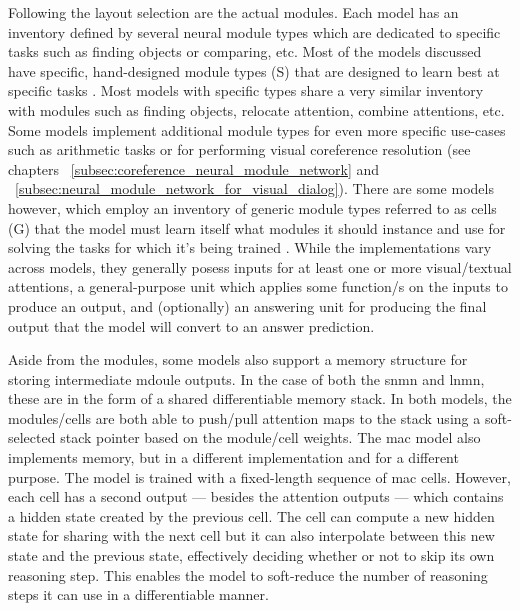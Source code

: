 Following the layout selection are the actual modules.
Each model has an inventory defined by several neural module types which are dedicated to specific tasks such as finding objects or comparing, etc.
Most of the models discussed have specific, hand-designed module types (S) that are designed to learn best at specific tasks \cite{andreas_deep_2016,hu_learning_2017,hu_explainable_2019,chen_teaching_2022,su_toward_2020,kottur_visual_2018,cho_visual_2021}.
Most models with specific types share a very similar inventory with modules such as finding objects, relocate attention, combine attentions, etc.
Some models implement additional module types for even more specific use-cases such as arithmetic tasks \cite{chen_teaching_2022} or for performing visual coreference resolution \cite{kottur_visual_2018,cho_visual_2021} (see chapters ~\ref{subsec:coreference_neural_module_network} and ~\ref{subsec:neural_module_network_for_visual_dialog}).
There are some models however, which employ an inventory of generic module types referred to as cells (G) that the model must learn itself what modules it should instance and use for solving the tasks for which it's being trained \cite{hudson_compositional_2018,pahuja_learning_2019,chen_meta_2020}.
While the implementations vary across models, they generally posess inputs for at least one or more visual/textual attentions, a general-purpose unit which applies some function/s on the inputs to produce an output, and (optionally) an answering unit for producing the final output that the model will convert to an answer prediction.

Aside from the modules, some models also support a memory structure for storing intermediate mdoule outputs.
In the case of both the \gls{snmn} and \gls{lnmn}, these are in the form of a shared differentiable memory stack.
In both models, the modules/cells are both able to push/pull attention maps to the stack using a soft-selected stack pointer based on the module/cell weights.
The \gls{mac} model also implements memory, but in a different implementation and for a different purpose.
The model is trained with a fixed-length sequence of \gls{mac} cells.
However, each cell has a second output --- besides the attention outputs --- which contains a hidden state created by the previous cell.
The cell can compute a new hidden state for sharing with the next cell but it can also interpolate between this new state and the previous state, effectively deciding whether or not to skip its own reasoning step.
This enables the model to soft-reduce the number of reasoning steps it can use in a differentiable manner.

